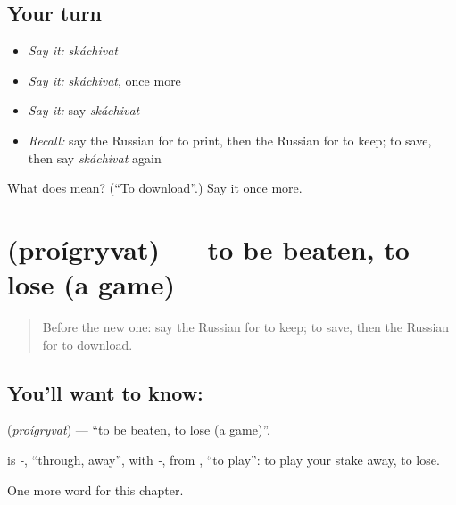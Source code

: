\subsection*{Your turn}
\begin{itemize}
\raggedright
  \item \emph{Say it:} \emph{skáchivat}
  \item \emph{Say it:} \emph{skáchivat}, once more
  \item \emph{Say it:} say \emph{skáchivat}
  \item \emph{Recall:} say the Russian for to print, then the Russian for to keep; to save, then say \emph{skáchivat} again
\end{itemize}

\begin{tcolorbox}[breakable,colback=teal!4,colframe=teal!35!black,title={Before you move on}]
What does  mean? (\textquotedblleft{}To download\textquotedblright{}.) Say it once more.
\end{tcolorbox}
\section[\texorpdfstring{\ru{проигрывать} (proígryvat)}{проигрывать (proígryvat)}]{ (proígryvat) — to be beaten, to lose (a game)}

\label{lesson:RU-C145-proigryvat}



\begin{quote}
Before the new one: say the Russian for to keep; to save, then the Russian for to download.
\end{quote}

\subsection*{You'll want to know: }
\textbf{} (\emph{proígryvat}) — \textquotedblleft{}to be beaten, to lose (a game)\textquotedblright{}.

\begin{cousinweb}
\textbf{} is \emph{-}, \textquotedblleft{}through, away\textquotedblright{}, with \emph{-}, from \emph{}, \textquotedblleft{}to play\textquotedblright{}: to play your stake away, to lose.
\end{cousinweb}

\begin{grammarlens}[title={What you've built}]
One more word for this chapter.
\end{grammarlens}

